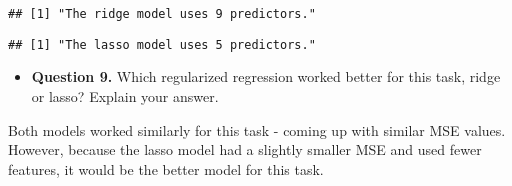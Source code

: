 \documentclass[
]{article}
\newenvironment{Shaded}{\begin{snugshade}}{\end{snugshade}}
\newcommand{\FloatTok}[1]{\textcolor[rgb]{0.00,0.00,0.81}{#1}}
\newcommand{\FunctionTok}[1]{\textcolor[rgb]{0.00,0.00,0.00}{#1}}
\newcommand{\NormalTok}[1]{#1}
\newcommand{\SpecialCharTok}[1]{\textcolor[rgb]{0.00,0.00,0.00}{#1}}
\newcommand{\StringTok}[1]{\textcolor[rgb]{0.31,0.60,0.02}{#1}}
\providecommand{\tightlist}{%
  \setlength{\itemsep}{0pt}\setlength{\parskip}{0pt}}
\begin{document}
\begin{verbatim}
## [1] "The ridge model uses 9 predictors."
\end{verbatim}

\begin{Shaded}
\end{Shaded}

\begin{verbatim}
## [1] "The lasso model uses 5 predictors."
\end{verbatim}

\begin{itemize}
\tightlist
\item
  \textbf{Question 9.} Which regularized regression worked better for
  this task, ridge or lasso? Explain your answer.
\end{itemize}

Both models worked similarly for this task - coming up with similar MSE
values. However, because the lasso model had a slightly smaller MSE and
used fewer features, it would be the better model for this task.
\end{document}
